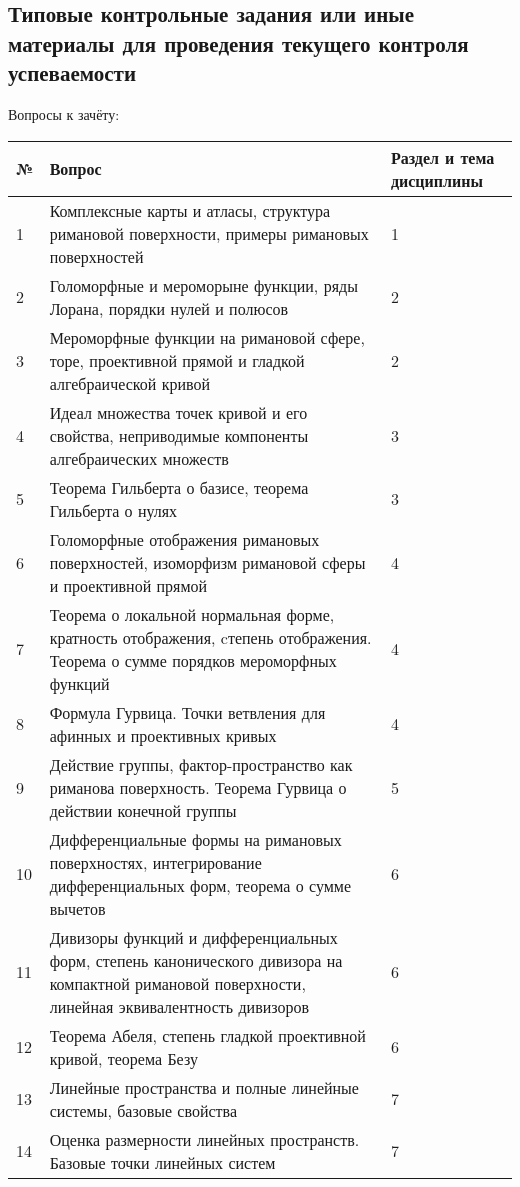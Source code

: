\documentclass[a4paper, 12pt]{article}
\begin{document}
\subsection{Типовые контрольные задания или иные материалы для проведения текущего контроля успеваемости}

Вопросы к зачёту:

\noindent
\begin{longtable}{ | p{0.5cm} | p{11.5cm} | p{2cm} | } 
    \hline
    \bf № & \textbf{Вопрос} & \textbf{Раздел и тема дисциплины} \\
    \hline
    \hline
    \endhead
    1 & Комплексные карты и атласы, структура римановой поверхности, примеры римановых поверхностей & 1 \\ \hline
2 & Голоморфные и мероморыне функции, ряды Лорана, порядки нулей и полюсов & 2 \\ \hline
3 & Мероморфные функции на римановой сфере, торе, проективной прямой и гладкой алгебраической кривой & 2 \\ \hline
4 & Идеал множества точек кривой и его свойства, неприводимые компоненты алгебраических множеств & 3 \\ \hline
5 & Теорема Гильберта о базисе, теорема Гильберта о нулях & 3 \\ \hline
6 & Голоморфные отображения римановых поверхностей, изоморфизм римановой сферы и проективной прямой & 4 \\ \hline
7 & Теорема о локальной нормальная форме, кратность отображения, cтепень отображения. Теорема о сумме порядков мероморфных функций & 4 \\ \hline
8 & Формула Гурвица. Точки ветвления для афинных и проективных кривых & 4 \\ \hline
9 & Действие группы, фактор-пространство как риманова поверхность. Теорема Гурвица о действии конечной группы & 5 \\ \hline
10 & Дифференциальные формы на римановых поверхностях, интегрирование дифференциальных форм, теорема о сумме вычетов & 6 \\ \hline
11 & Дивизоры функций и дифференциальных форм, степень канонического дивизора на компактной римановой поверхности, линейная эквивалентность дивизоров & 6 \\ \hline
12 & Теорема Абеля, степень гладкой проективной кривой, теорема Безу & 6 \\ \hline
13 & Линейные пространства и полные линейные системы, базовые свойства & 7 \\ \hline
14 & Оценка размерности линейных пространств. Базовые точки линейных систем & 7 \\ \hline

\end{longtable}
\end{document}
